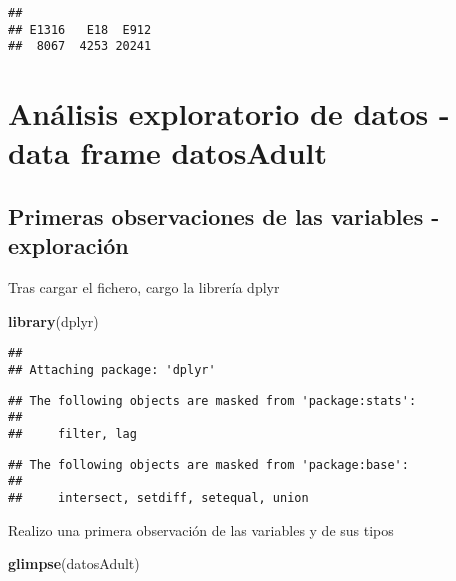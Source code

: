 \documentclass[]{article}
\newenvironment{Shaded}{\begin{snugshade}}{\end{snugshade}}
\newcommand{\KeywordTok}[1]{\textcolor[rgb]{0.13,0.29,0.53}{\textbf{#1}}}
\newcommand{\NormalTok}[1]{#1}
\begin{document}
\begin{verbatim}
## 
## E1316   E18  E912 
##  8067  4253 20241
\end{verbatim}

\hypertarget{analisis-exploratorio-de-datos---data-frame-datosadult}{%
\section{Análisis exploratorio de datos - data frame
datosAdult}\label{analisis-exploratorio-de-datos---data-frame-datosadult}}

\hypertarget{primeras-observaciones-de-las-variables---exploracion}{%
\subsection{Primeras observaciones de las variables -
exploración}\label{primeras-observaciones-de-las-variables---exploracion}}

Tras cargar el fichero, cargo la librería dplyr

\begin{Shaded}
\begin{Highlighting}[]
\KeywordTok{library}\NormalTok{(dplyr)}
\end{Highlighting}
\end{Shaded}

\begin{verbatim}
## 
## Attaching package: 'dplyr'
\end{verbatim}

\begin{verbatim}
## The following objects are masked from 'package:stats':
## 
##     filter, lag
\end{verbatim}

\begin{verbatim}
## The following objects are masked from 'package:base':
## 
##     intersect, setdiff, setequal, union
\end{verbatim}

Realizo una primera observación de las variables y de sus tipos

\begin{Shaded}
\begin{Highlighting}[]
\KeywordTok{glimpse}\NormalTok{(datosAdult)}
\end{Highlighting}
\end{Shaded}
\end{document}

